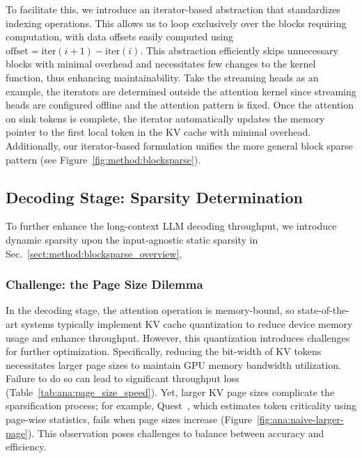 To facilitate this, we introduce an iterator-based abstraction that standardizes indexing operations. This allows us to loop exclusively over the blocks requiring computation, with data offsets easily computed using 
$\text{offset} = \text{iter}(i + 1) - \text{iter}(i)$. This abstraction efficiently skips unnecessary blocks with minimal overhead and necessitates few changes to the kernel function, thus enhancing maintainability. Take the streaming heads as an example, the iterators are determined outside the attention kernel since streaming heads are configured offline and the attention pattern is fixed. Once the attention on sink tokens is complete, the iterator automatically updates the memory pointer to the first local token in the KV cache with minimal overhead. Additionally, our iterator-based formulation unifies the more general block sparse pattern (see Figure~\ref{fig:method:blocksparse}).




\subsection{Decoding Stage: Sparsity Determination}
\label{sect:method:decoding_sparsity_determination}




To further enhance the long-context LLM decoding throughput, we introduce dynamic sparsity upon the input-agnostic static sparsity in Sec.~\ref{sect:method:blocksparse_overview}. 

\subsubsection{Challenge: the Page Size Dilemma} 




In the decoding stage, the attention operation is memory-bound, so state-of-the-art systems typically implement KV cache quantization to reduce device memory usage and enhance throughput. However, this quantization introduces challenges for further optimization. Specifically, reducing the bit-width of KV tokens necessitates larger page sizes to maintain GPU memory bandwidth utilization. Failure to do so can lead to significant throughput loss (Table~\ref{tab:ana:page_size_speed}). Yet, larger KV page sizes complicate the sparsification process; for example, Quest~\cite{tang2024quest}, which estimates token criticality using page-wise statistics, fails when page sizes increase (Figure~\ref{fig:ana:naive-larger-page}). This observation poses challenges to balance between accuracy and efficiency. 





